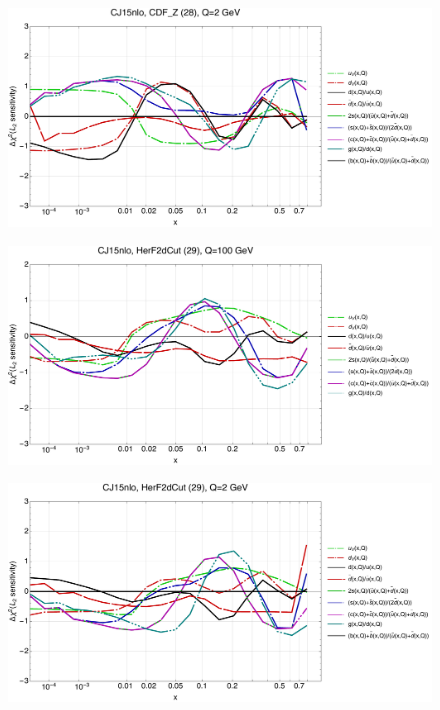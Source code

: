 \documentclass[10pt,aps,prd,floatfix,titlepage]{revtex4}
\begin{document}
\begin{figure}
\includegraphics[width=\textwidth,height=0.44\textheight,keepaspectratio]{2/28_CJ15nlo_q2_Sf_2.pdf}
\caption{}
\end{figure}
\clearpage
\begin{figure}
\includegraphics[width=\textwidth,height=0.44\textheight,keepaspectratio]{2/29_CJ15nlo_q100_Sf_2.pdf}
\caption{}
\end{figure}
\begin{figure}
\includegraphics[width=\textwidth,height=0.44\textheight,keepaspectratio]{2/29_CJ15nlo_q2_Sf_2.pdf}
\caption{}
\end{figure}
\end{document}
